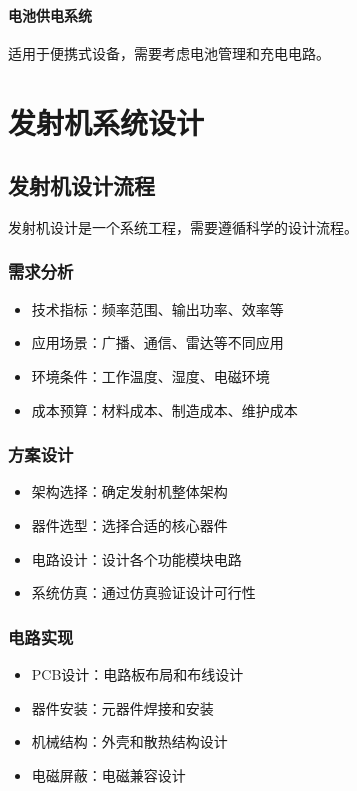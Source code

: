 \documentclass[12pt,UTF8]{ctexbook}
\begin{document}
\subsubsection{电池供电系统}
适用于便携式设备，需要考虑电池管理和充电电路。

\chapter{发射机系统设计}

\section{发射机设计流程}

发射机设计是一个系统工程，需要遵循科学的设计流程。

\subsection{需求分析}
\begin{itemize}[leftmargin=3.5em]
    \item 技术指标：频率范围、输出功率、效率等
    \item 应用场景：广播、通信、雷达等不同应用
    \item 环境条件：工作温度、湿度、电磁环境
    \item 成本预算：材料成本、制造成本、维护成本
\end{itemize}

\subsection{方案设计}
\begin{itemize}[leftmargin=3.5em]
    \item 架构选择：确定发射机整体架构
    \item 器件选型：选择合适的核心器件
    \item 电路设计：设计各个功能模块电路
    \item 系统仿真：通过仿真验证设计可行性
\end{itemize}

\subsection{电路实现}
\begin{itemize}[leftmargin=3.5em]
    \item PCB设计：电路板布局和布线设计
    \item 器件安装：元器件焊接和安装
    \item 机械结构：外壳和散热结构设计
    \item 电磁屏蔽：电磁兼容设计
\end{itemize}
\end{document}

